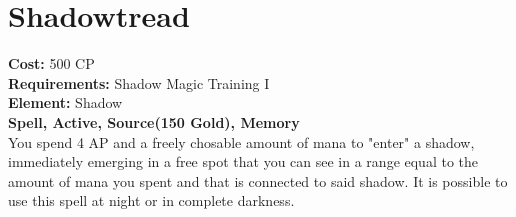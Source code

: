 \section{Shadowtread}
\textbf{Cost:} 500 CP\\
\textbf{Requirements:} Shadow Magic Training I\\
\textbf{Element:} Shadow\\
\textbf{Spell, Active, Source(150 Gold), Memory}\\
You spend 4 AP and a freely chosable amount of mana to "enter" a shadow, immediately emerging in a free spot that you can see in a range equal to the amount of mana you spent and that is connected to said shadow. It is possible to use this spell at night or in complete darkness.\\